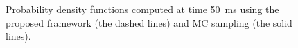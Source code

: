 \begin{figure}[b]
  \centering
  \vspace{-2.0em}
  \vspace{-2.0em}
  \caption{Probability density functions computed at time 50~ms using the proposed framework (the dashed lines) and MC sampling (the solid lines).}
\end{figure}
